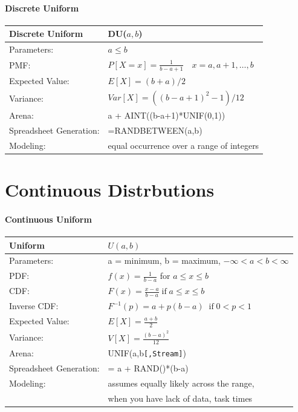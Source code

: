 \documentclass[
]{book}
\theoremstyle{definition}
\theoremstyle{definition}
\theoremstyle{definition}
\theoremstyle{definition}
\theoremstyle{remark}
\begin{document}
\hypertarget{discrete-uniform}{%
\subsubsection*{Discrete Uniform}\label{discrete-uniform}}


\begin{longtable}[]{@{}ll@{}}
\toprule
\textbf{Discrete Uniform} & DU(\(a, b\)) \\
\midrule
\endhead
Parameters: & \(a \leq b\) \\
PMF: & \(P[X=x] = \frac{1}{b-a+1} \quad x = a, a+1, \ldots, b\) \\
Expected Value: & \(E[X] = (b+a)/2\) \\
Variance: & \(Var[X] = \left( \left( b-a+1\right)^2 -1 \right)/12\) \\
Arena: & a + AINT((b-a+1)*UNIF(0,1)) \\
Spreadsheet Generation: & =RANDBETWEEN(a,b) \\
Modeling: & equal occurrence over a range of integers \\
\bottomrule
\end{longtable}

\hypertarget{app:ContinuousDistributions}{%
\chapter{Continuous Distrbutions}\label{app:ContinuousDistributions}}

\hypertarget{continuous-uniform}{%
\subsubsection*{Continuous Uniform}\label{continuous-uniform}}


\begin{longtable}[]{@{}ll@{}}
\toprule
\textbf{Uniform} & \(U(a,b)\) \\
\midrule
\endhead
Parameters: & a = minimum, b = maximum, \(-\infty < a < b < \infty\) \\
PDF: & \(f(x) = \frac{1}{b-a}\) for \(a \leq x \leq b\) \\
CDF: & \(F(x) = \frac{x-a}{b-a} \; \text{if} \; a \leq x \leq b\) \\
Inverse CDF: & \(F^{-1}(p) = a + p(b-a) \; \; \text{if} \; 0 < p < 1\) \\
Expected Value: & \(E[X]=\frac{a+b}{2}\) \\
Variance: & \(V[X] = \frac{(b-a)^2}{12}\) \\
Arena: & UNIF(a,b\texttt{{[},Stream{]}}) \\
Spreadsheet Generation: & = a + RAND()*(b-a) \\
Modeling: & assumes equally likely across the range, \\
& when you have lack of data, task times \\
\bottomrule
\end{longtable}
\end{document}

